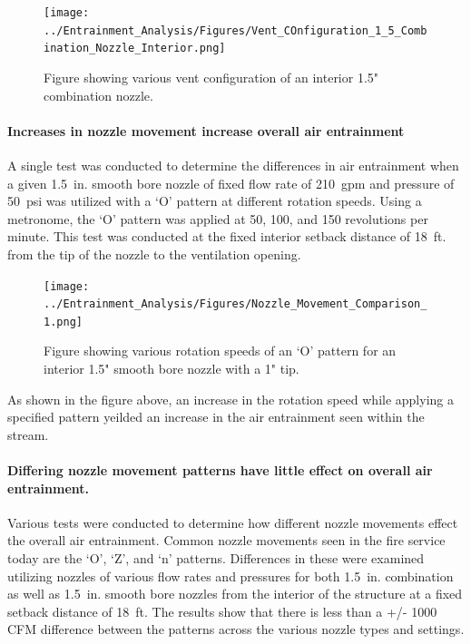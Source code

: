 \documentclass{article}
\begin{document}
\begin{figure}[!ht]
	\centering
	\texttt{[image: ../Entrainment\_Analysis/Figures/Vent\_COnfiguration\_1\_5\_Combination\_Nozzle\_Interior.png]}
	\caption{Figure showing various vent configuration of an interior 1.5" combination nozzle.}
	\label{fig:1_5_Interior_Vent_Configuration_Combination_Comparison}
\end{figure}

\clearpage

\paragraph{Increases in nozzle movement increase overall air entrainment}

A single test was conducted to determine the differences in air entrainment when a given 1.5~in. smooth bore nozzle of fixed flow rate of 210~gpm and pressure of 50~psi was utilized with a `O' pattern at different rotation speeds. Using a metronome, the `O' pattern was applied at 50, 100, and 150 revolutions per minute. This test was conducted at the fixed interior setback distance of 18~ft. from the tip of the nozzle to the ventilation opening.

\begin{figure}[!ht]
	\centering
	\texttt{[image: ../Entrainment\_Analysis/Figures/Nozzle\_Movement\_Comparison\_1.png]}
	\caption{Figure showing various rotation speeds of an `O' pattern for an interior 1.5" smooth bore nozzle with a 1" tip.}
	\label{fig:1_5_Interior_Nozzle_Movement_RotationSpeed_Comparison}
\end{figure}

As shown in the figure above, an increase in the rotation speed while applying a specified pattern yeilded an increase in the air entrainment seen within the stream.

\clearpage

\paragraph{Differing nozzle movement patterns have little effect on overall air entrainment.} \mbox{}

Various tests were conducted to determine how different nozzle movements effect the overall air entrainment. Common nozzle movements seen in the fire service today are the `O', `Z', and `n' patterns. Differences in these were examined utilizing nozzles of various flow rates and pressures for both 1.5~in. combination as well as 1.5~in. smooth bore nozzles from the interior of the structure at a fixed setback distance of 18~ft. The results show that there is less than a +/- 1000 CFM difference between the patterns across the various nozzle types and settings.
\end{document}
